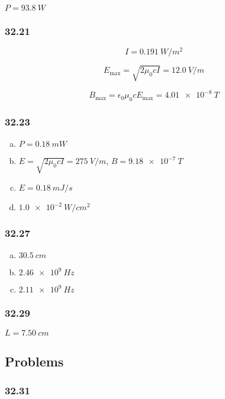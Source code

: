 \documentclass{article}
\begin{document}
$P = \qty{93.8}{W}$

\subsubsection{32.21}

\[I = \qty{0.191}{W/m^2}\]

\[E_\text{max} = \sqrt{2 \mu_0 c I} = \qty{12.0}{V/m}\]

\[B_\text{max} = \epsilon_0 \mu_0 c E_\text{max} = \qty{4.01e-8}{T}\]

\subsubsection{32.23}

\begin{enumerate}[(a)]
  \item $P = \qty{0.18}{mW}$

  \item $E = \sqrt{2 \mu_0 c I} = \qty{275}{V/m}$, $B = \qty{9.18e-7}{T}$

  \item $E = \qty{0.18}{mJ/s}$

  \item $\qty{1.0e-2}{W/cm^2}$
\end{enumerate}

\subsubsection{32.27}

\begin{enumerate}[(a)]
  \item $\qty{30.5}{cm}$

  \item $\qty{2.46e9}{Hz}$

  \item $\qty{2.11e9}{Hz}$
\end{enumerate}

\subsubsection{32.29}

$L = \qty{7.50}{cm}$

\subsection{Problems}

\subsubsection{32.31}
\end{document}
